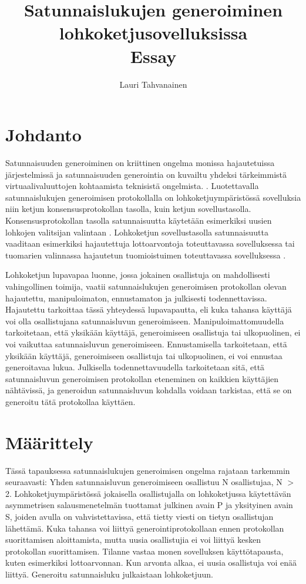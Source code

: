 \documentclass{article}
\title{ Satunnaislukujen generoiminen lohkoketjusovelluksissa \\\small{Essay}}
\author{Lauri Tahvanainen}
\begin{document}
\maketitle

\section{Johdanto}

Satunnaisuuden generoiminen on kriittinen ongelma monissa hajautetuissa järjestelmissä ja satunnaisuuden generointia on kuvailtu yhdeksi tärkeimmistä virtuaalivaluuttojen kohtaamista teknisistä ongelmista. \cite{noauthor_hpoc_2015_nodate}. Luotettavalla satunnaislukujen generoimisen protokollalla on lohkoketjuympäristössä sovelluksia niin ketjun konsensusprotokollan tasolla, kuin ketjun sovellustasolla. Konsensusprotokollan tasolla satunnaisuutta käytetään esimerkiksi uusien lohkojen valitsijan valintaan \cite{chen_algorand_2017}. Lohkoketjun sovellustasolla satunnaisuutta vaaditaan esimerkiksi hajautettuja lottoarvontoja toteuttavassa sovelluksessa \cite{pooltogether_pooltogether_nodate} tai tuomarien valinnassa hajautetun tuomioistuimen toteuttavassa sovelluksessa \cite{lesaege_kleros_2020}. 

Lohkoketjun lupavapaa luonne, jossa jokainen osallistuja on mahdollisesti vahingollinen toimija, vaatii satunnaislukujen generoimisen protokollan olevan hajautettu, manipuloimaton, ennustamaton ja julkisesti todennettavissa. Hajautettu tarkoittaa tässä yhteydessä lupavapautta, eli kuka tahansa käyttäjä voi olla osallistujana satunnaisluvun generoimiseen. Manipuloimattomuudella tarkoitetaan, että yksikään käyttäjä, generoimiseen osallistuja tai ulkopuolinen, ei voi vaikuttaa satunnaisluvun generoimiseen. Ennustamisella tarkoitetaan, että yksikään käyttäjä, generoimiseen osallistuja tai ulkopuolinen, ei voi ennustaa generoitavaa lukua. Julkisella todennettavuudella tarkoitetaan sitä, että satunnaisluvun generoimisen protokollan eteneminen on kaikkien käyttäjien nähtävissä, ja generoidun satunnaisluvun kohdalla voidaan tarkistaa, että se on generoitu tätä protokollaa käyttäen.

\section{Määrittely}

Tässä tapauksessa satunnaislukujen generoimisen ongelma rajataan tarkemmin seuraavasti:
Yhden satunnaisluvun generoimiseen osallistuu N osallistujaa,  N $>$ 2. Lohkoketjuympäristössä jokaisella osallistujalla on lohkoketjussa käytettävän asymmetrisen salausmenetelmän tuottamat julkinen avain P ja yksityinen avain S, joiden avulla on vahvistettavissa, että tietty viesti on tietyn osallistujan lähettämä. Kuka tahansa voi liittyä generointiprotokollaan ennen protokollan suorittamisen aloittamista, mutta uusia osallistujia ei voi liittyä kesken protokollan suorittamisen. Tilanne vastaa monen sovelluksen käyttötapausta, kuten esimerkiksi lottoarvonnan. Kun arvonta alkaa, ei uusia osallistuja voi enää liittyä. Generoitu satunnaisluku julkaistaan lohkoketjuun. 
\end{document}
